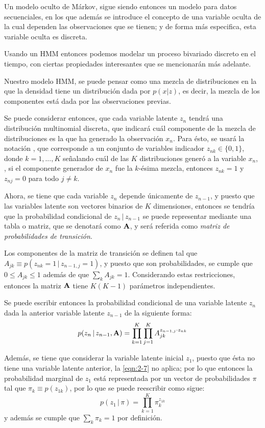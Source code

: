 Un modelo oculto de Márkov, sigue siendo entonces un modelo para datos secuenciales, en los que además se introduce el concepto de una variable oculta de la cual dependen las observaciones que se tienen; y de forma más especifica, esta variable oculta es discreta. 

Usando un HMM entonces podemos modelar un proceso bivariado discreto en el tiempo, con ciertas propiedades interesantes que se mencionarán más adelante.

Nuestro modelo HMM, se puede pensar como una mezcla de distribuciones en la que la densidad tiene un distribución dada por $p(x|z)$, es decir, la mezcla de los componentes está dada por las observaciones previas.

Se puede considerar entonces, que cada variable latente $z_n$ tendrá una distribución multinomial discreta, que indicará cuál componente de la mezcla de distribuciones es la que ha generado la observación $x_n$. Para ésto, se usará la notación \unk, que corresponde a un conjunto de variables indicador $z_{nk} \in \lbrace 0, 1 \rbrace$, donde $k = 1, ..., K$ señalando cuál de las $K$ distribuciones generó a la variable $x_n$, \ie, si el componente generador de $x_n$ fue la $k$-ésima mezcla, entonces $z_{nk} = 1$ y $z_{nj} = 0$ para todo $j \neq k$.

Ahora, se tiene que cada variable $z_n$ depende únicamente de $z_{n-1}$, y puesto que las variables latente son vectores binarios de $K$ dimensiones, entonces se tendría que la probabilidad condicional de $z_n \,|\, z_{n-1}$ se puede representar mediante una tabla o matriz, que se denotará como $\textbf{A}$, y será referida como \textit{matriz de probabilidades de transición}. 

Los componentes de la matriz de transición se definen tal que $A_{jk} \equiv p(z_{nk} = 1 \,|\,  z_{n-1, j} = 1)$, y puesto que son probabilidades, se cumple que $0 \leq A_{jk} \leq 1$ además de que $\sum_k A_{jk} = 1$. Considerando estas restricciones, entonces la matriz $\textbf{A}$ tiene $K (K-1)$ parámetros independientes.

Se puede escribir entonces la probabilidad condicional de una variable latente $z_n$ dada la anterior variable latente $z_{n-1}$ de la siguiente forma: 
\begin{equation}
\label{eqn:2-8}
p(z_n \,|\, z_{n-1}, \textbf{A}) = \prod_{k=1}^K \prod_{j=1}^K A_{jk}^{z_{n-1, j} 
        \cdot z_{nk}}
\end{equation}

Además, se tiene que considerar la variable latente inicial $z_1$, puesto que ésta no tiene una variable latente anterior, la \autoref{eqn:2-7} no aplica; por lo que entonces la probabilidad marginal de $z_1$ está representada por un vector de probabilidades $\pi$ tal que $\pi_k \equiv p(z_{1k})$, por lo que se puede reescribir como sigue: 
\begin{equation}
p(z_1 \,|\, \pi) = \prod_{k=1}^K \pi_k^{z_{1k}}
\label{eqn:2-9}
\end{equation}
y además se cumple que $\sum_k \pi_k = 1$ por definición.

